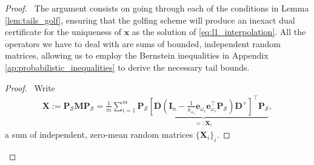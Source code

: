 \begin{proof}
    \pf\ The argument consists on going through each of the conditions in Lemma \ref{lem:tails_golf}, ensuring that the golfing scheme will produce an inexact dual certificate for the uniqueness of $\mathbf{x}$ as the solution of \eqref{eq:l1_interpolation}. All the operators we have to deal with are sums of bounded, independent random matrices, allowing us to employ the Bernstein inequalities in Appendix \ref{ap:probabilistic_inequalities} to derive the necessary tail bounds.

        \begin{proof}
            \pf\ Write
            \begin{align*}
                \mathbf{X} := \mathbf{P}_\mathcal{S} \mathbf{M} \mathbf{P}_\mathcal{S} = \frac{1}{m} \sum_{i=1}^{m} \underbrace{\mathbf{P}_\mathcal{S}\left [ \mathbf{D} \left ( \mathbf{I}_n - \frac{1}{\pi_{\omega_i}}\mathbf{e}_{\omega_i} \mathbf{e}_{\omega_i}^\top \mathbf{P}_\mathcal{S} \right ) \mathbf{D}^{+} \right ]^\top \mathbf{P}_\mathcal{S}}_{=: \mathbf{X}_i},
            \end{align*}
            a sum of independent, zero-mean random matrices $\{\mathbf{X}_i\}_i$.
            \step{}{
}
\end{proof}
\end{proof}
